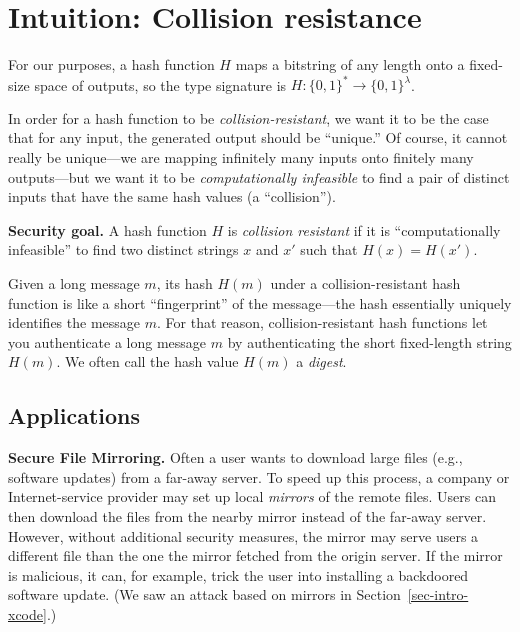 \documentclass[
  letterpaper,
]{scrbook}
\newcommand{\zo}{\{0,1\}}
\newcommand{\bin}{\zo}
\theoremstyle{definition}
\theoremstyle{plain}
\theoremstyle{plain}
\theoremstyle{remark}
\begin{document}
\section{Intuition: Collision
resistance}\label{intuition-collision-resistance}

For our purposes, a hash function \(H\) maps a bitstring of any length
onto a fixed-size space of outputs, so the type signature is
\(H: \bin^* \rightarrow \bin^{\lambda}\).

In order for a hash function to be \emph{collision-resistant}, we want
it to be the case that for any input, the generated output should be
``unique.'' Of course, it cannot really be unique---we are mapping
infinitely many inputs onto finitely many outputs---but we want it to be
\emph{computationally infeasible} to find a pair of distinct inputs that
have the same hash values (a ``collision'').

\textbf{Security goal.} A hash function \(H\) is \emph{collision
resistant} if it is ``computationally infeasible'' to find two distinct
strings \(x\) and \(x'\) such that \(H(x) = H(x')\).

Given a long message \(m\), its hash \(H(m)\) under a
collision-resistant hash function is like a short ``fingerprint'' of the
message---the hash essentially uniquely identifies the message \(m\).
For that reason, collision-resistant hash functions let you authenticate
a long message \(m\) by authenticating the short fixed-length string
\(H(m)\). We often call the hash value \(H(m)\) a \emph{digest}.

\subsection{Applications}\label{applications}

\textbf{Secure File Mirroring.} Often a user wants to download large
files (e.g., software updates) from a far-away server. To speed up this
process, a company or Internet-service provider may set up local
\emph{mirrors} of the remote files. Users can then download the files
from the nearby mirror instead of the far-away server. However, without
additional security measures, the mirror may serve users a different
file than the one the mirror fetched from the origin server. If the
mirror is malicious, it can, for example, trick the user into installing
a backdoored software update. (We saw an attack based on mirrors in
Section~\ref{sec-intro-xcode}.)
\end{document}
